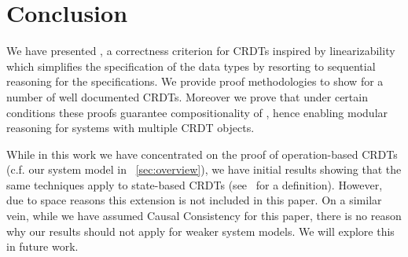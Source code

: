 \section{Conclusion}
\label{sec:conclusion}

We have presented \CRDTLin{}, a correctness criterion for CRDTs
inspired by linearizability which simplifies the specification of the
data types by resorting to sequential reasoning for the
specifications.
%
We provide proof methodologies to show \CRDTLinshort{} for a number of
well documented CRDTs.
%
Moreover we prove that under certain conditions these proofs guarantee
compositionality of \CRDTLinshort{}, hence enabling modular reasoning
for systems with multiple CRDT objects.
%

While in this work we have concentrated on the proof of
operation-based CRDTs (c.f. our system model in
\sectionautorefname~\ref{sec:overview}), we have initial results
showing that the same techniques apply to state-based CRDTs
(see~\cite{ShapiroPBZ11} for a definition).
%
However, due to space reasons this extension is not included in this
paper.
%
On a similar vein, while we have assumed Causal Consistency for this
paper, there is no reason why our results should not apply for weaker
system models.
%
We will explore this in future work.


